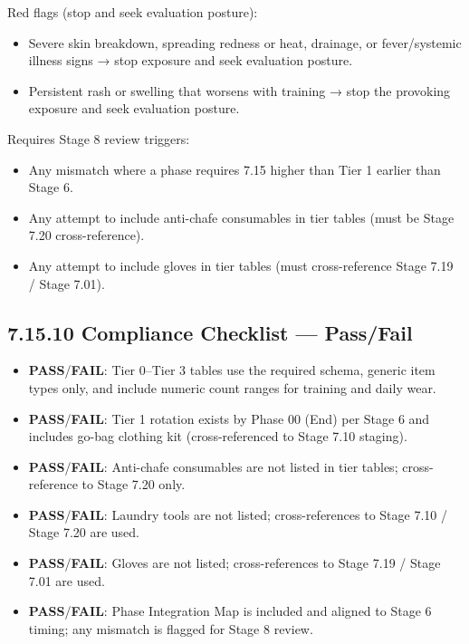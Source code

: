 \documentclass[10pt]{article}
\begin{document}
Red flags (stop and seek evaluation posture):

\begin{itemize}
\item Severe skin breakdown, spreading redness or heat, drainage, or fever/systemic illness signs → stop exposure and seek evaluation posture.
\item Persistent rash or swelling that worsens with training → stop the provoking exposure and seek evaluation posture.
\end{itemize}

Requires Stage 8 review triggers:

\begin{itemize}
\item Any mismatch where a phase requires 7.15 higher than Tier 1 earlier than Stage 6.
\item Any attempt to include anti-chafe consumables in tier tables (must be Stage 7.20 cross-reference).
\item Any attempt to include gloves in tier tables (must cross-reference Stage 7.19 / Stage 7.01).
\end{itemize}

\subsection*{7.15.10 Compliance Checklist — Pass/Fail}
{}

\begin{itemize}
\item \textbf{PASS}/\textbf{FAIL}: Tier 0–Tier 3 tables use the required schema, generic item types only, and include numeric count ranges for training and daily wear.
\item \textbf{PASS}/\textbf{FAIL}: Tier 1 rotation exists by Phase 00 (End) per Stage 6 and includes go-bag clothing kit (cross-referenced to Stage 7.10 staging).
\item \textbf{PASS}/\textbf{FAIL}: Anti-chafe consumables are not listed in tier tables; cross-reference to Stage 7.20 only.
\item \textbf{PASS}/\textbf{FAIL}: Laundry tools are not listed; cross-references to Stage 7.10 / Stage 7.20 are used.
\item \textbf{PASS}/\textbf{FAIL}: Gloves are not listed; cross-references to Stage 7.19 / Stage 7.01 are used.
\item \textbf{PASS}/\textbf{FAIL}: Phase Integration Map is included and aligned to Stage 6 timing; any mismatch is flagged for Stage 8 review.
\end{itemize}
\end{document}
